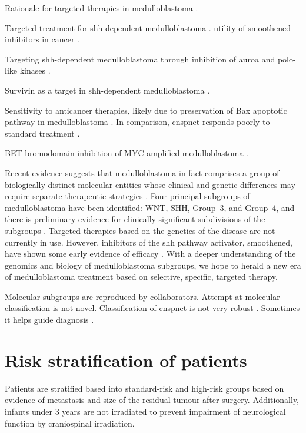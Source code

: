 Rationale for targeted therapies in medulloblastoma .

Targeted treatment for \gls{shh}-dependent medulloblastoma .
utility of smoothened inhibitors in cancer .

Targeting \gls{shh}-dependent medulloblastoma through inhibition of auroa and polo-like kinases .

Survivin as a target in \gls{shh}-dependent medulloblastoma .

Sensitivity to anticancer therapies, likely due to preservation of Bax apoptotic pathway in medulloblastoma .
In comparison, \gls{cnspnet} responds poorly to standard treatment .

BET bromodomain inhibition of MYC-amplified medulloblastoma . 


Recent evidence suggests that medulloblastoma in fact comprises a group of biologically distinct molecular entities whose clinical and genetic differences may require separate therapeutic strategies . Four principal subgroups of medulloblastoma have been identified: WNT, SHH, Group~3, and Group~4, and there is preliminary evidence for clinically significant subdivisions of the subgroups . Targeted therapies based on the genetics of the disease are not currently in use. However, inhibitors of the \gls{shh} pathway activator, smoothened, have shown some early evidence of efficacy . With a deeper understanding of the genomics and biology of medulloblastoma subgroups, we hope to herald a new era of medulloblastoma treatment based on selective, specific, targeted therapy.

Molecular subgroups are reproduced by collaborators.
Attempt at molecular classification is not novel. Classification of \gls{cnspnet} is not very robust .
Sometimes it helps guide diagnosis .


\section{Risk stratification of patients}

Patients are stratified based into standard-risk and high-risk groups based on evidence of metastasis and size of the residual tumour after surgery. Additionally, infants under 3 years are not irradiated to prevent impairment of neurological function by craniospinal irradiation.


